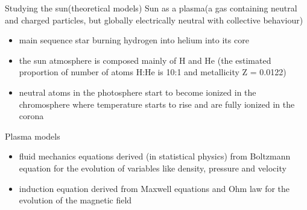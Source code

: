 \documentclass{beamer}
\begin{document}
\begin{frame}{Studying the sun(theoretical models)}
Sun as a plasma(a gas containing neutral and charged particles, but globally electrically neutral with collective behaviour)
\begin{itemize}
\item main sequence star burning hydrogen into helium into its core
\item the sun atmosphere is composed mainly of H and He (the estimated proportion of number of atoms H:He is 10:1 and metallicity Z = 0.0122)
\item neutral atoms in the photosphere  start to become ionized in the chromosphere where temperature starts to rise and  
are fully ionized in the corona  
\end{itemize}
Plasma models
\begin{itemize}
\item fluid mechanics equations derived (in statistical physics) from Boltzmann equation 
for the evolution of variables like density, pressure and velocity
\item induction equation derived from Maxwell equations and Ohm law for the evolution of the magnetic field
\end{itemize}

\end{frame}
\end{document}
